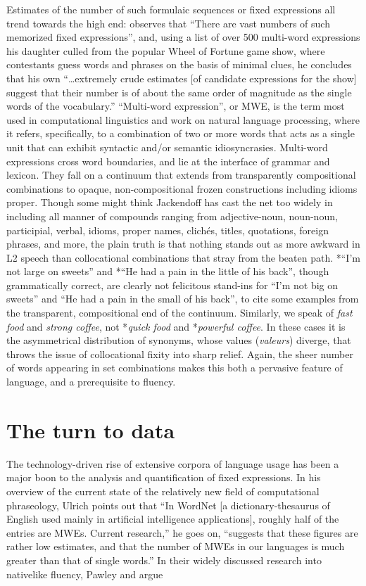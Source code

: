 \documentclass[output=paper]{langsci/langscibook}
\begin{document}
Estimates of the number of such formulaic sequences or fixed expressions all trend towards the high end: \citet[156]{jackendoff_architecture_1997} observes that “There are vast numbers of such memorized fixed expressions”, and, using a list of over 500 multi-word expressions his daughter culled from the popular Wheel of Fortune game show, where contestants guess words and phrases on the basis of minimal clues, he concludes that his own “…extremely crude estimates [of candidate expressions for the show] suggest that their number is of about the same order of magnitude as the single words of the vocabulary.” ``Multi-word expression'', or MWE, is the term most used in computational linguistics and work on natural language processing, where it refers, specifically, to a combination of two or more words that acts as a single unit that can exhibit syntactic and/or semantic idiosyncrasies. Multi-word expressions cross word boundaries, and lie at the interface of grammar and lexicon. They fall on a continuum that extends from transparently compositional combinations to opaque, non-compositional frozen constructions including idioms proper. Though some might think Jackendoff has cast the net too widely in including all manner of compounds ranging from adjective-noun, noun-noun, participial, verbal, idioms, proper names, clichés, titles, quotations, foreign phrases, and more, the plain truth is that nothing stands out as more awkward in L2 speech than collocational combinations that stray from the beaten path. *“I’m not large on sweets” and *“He had a pain in the little of his back”, though grammatically correct, are clearly not felicitous stand-ins for “I’m not big on sweets” and “He had a pain in the small of his back”, to cite some examples from the transparent, compositional end of the continuum. Similarly, we speak of \textit{fast food} and \textit{strong coffee}, not *\textit{quick food} and *\textit{powerful coffee}. In these cases it is the asymmetrical distribution of synonyms, whose values (\textit{valeurs}) diverge, that throws the issue of collocational fixity into sharp relief. Again, the sheer number of words appearing in set combinations makes this both a pervasive feature of language, and a prerequisite to fluency. 

\section{The turn to data}

The technology-driven rise of extensive corpora of language usage has been a major boon to the analysis and quantification of fixed expressions. In his overview of the current state of the relatively new field of computational phraseology, Ulrich \citet[348]{granger_computational_2008} points out that “In WordNet [a dictionary-thesaurus of English used mainly in artificial intelligence applications], roughly half of the entries are MWEs. Current research,” he goes on, “suggests that these figures are rather low estimates, and that the number of MWEs in our languages is much greater than that of single words.” In their widely discussed research into nativelike fluency, Pawley and \citet[191--192]{richards_two_1983} argue 
\end{document}
